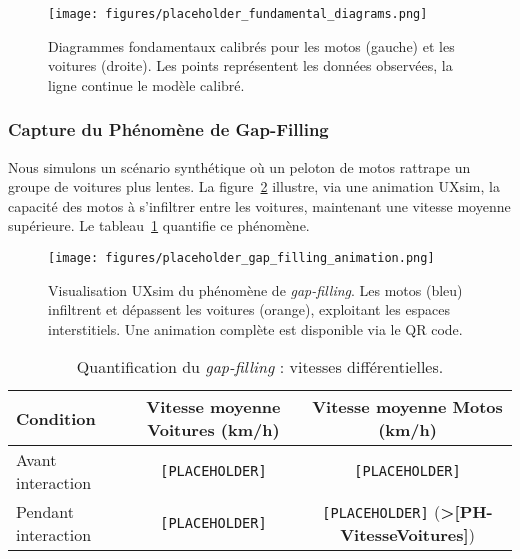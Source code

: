 \begin{figure}[htbp]
    \centering
    \texttt{[image: figures/placeholder\_fundamental\_diagrams.png]}
    \caption{Diagrammes fondamentaux calibrés pour les motos (gauche) et les voitures (droite). Les points représentent les données observées, la ligne continue le modèle calibré.}
    \label{fig:fundamental_diagrams}
\end{figure}

\subsubsection{Capture du Phénomène de Gap-Filling}
\label{subsec:validation_gap_filling}

Nous simulons un scénario synthétique où un peloton de motos rattrape un groupe de voitures plus lentes. La figure~\ref{fig:gap_filling_uxsim} illustre, via une animation UXsim, la capacité des motos à s'infiltrer entre les voitures, maintenant une vitesse moyenne supérieure. Le tableau~\ref{tab:gap_filling_metrics} quantifie ce phénomène.

\begin{figure}[htbp]
    \centering
    \texttt{[image: figures/placeholder\_gap\_filling\_animation.png]}
    \caption{Visualisation UXsim du phénomène de \textit{gap-filling}. Les motos (bleu) infiltrent et dépassent les voitures (orange), exploitant les espaces interstitiels. Une animation complète est disponible via le QR code.}
    \label{fig:gap_filling_uxsim}
\end{figure}

\begin{table}[htbp]
    \centering
    \caption{Quantification du \textit{gap-filling} : vitesses différentielles.}
    \label{tab:gap_filling_metrics}
    \begin{tabular}{lcc}
        \toprule
        \textbf{Condition}  & \textbf{Vitesse moyenne Voitures (km/h)} & \textbf{Vitesse moyenne Motos (km/h)}                   \\
        \midrule
        Avant interaction   & \texttt{[PLACEHOLDER]}                   & \texttt{[PLACEHOLDER]}                                  \\
        Pendant interaction & \texttt{[PLACEHOLDER]}                   & \texttt{[PLACEHOLDER]} (\textbf{>[PH-VitesseVoitures]}) \\
        \bottomrule
    \end{tabular}
\end{table}

